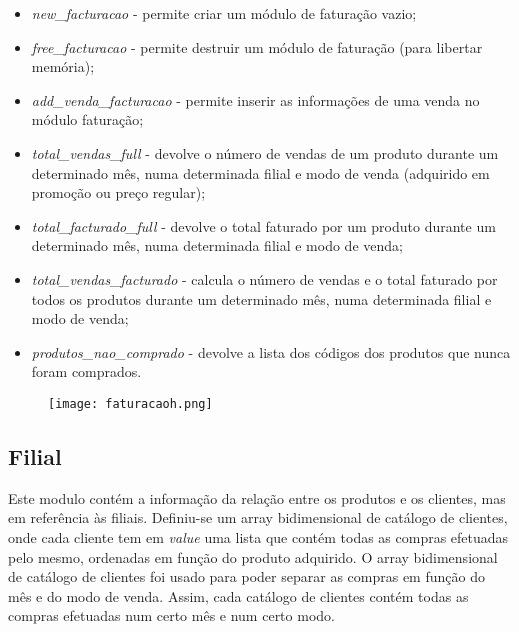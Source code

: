 \documentclass{article}
\begin{document}
\begin{itemize}
\item \textit{new\_facturacao} - permite criar um módulo de faturação vazio;
\item  \textit{free\_facturacao} - permite destruir um módulo de faturação (para libertar memória);
\item \textit{add\_venda\_facturacao} - permite inserir as informações de uma venda no módulo faturação;
\item \textit{total\_vendas\_full} - devolve o número de vendas de um produto durante um determinado mês, numa determinada filial e modo de venda (adquirido em promoção ou preço regular);
\item \textit{total\_facturado\_full} - devolve o total faturado por um produto durante um determinado mês, numa determinada filial e modo de venda;
\item \textit{total\_vendas\_facturado} - calcula o número de vendas e o total faturado por todos os produtos durante um determinado mês, numa determinada filial e modo de venda;
\item \textit{produtos\_nao\_comprado} - devolve a lista dos códigos dos produtos que nunca foram comprados.
\end{itemize}

\begin{figure}[h!]
\texttt{[image: faturacaoh.png]}
\centering
\end{figure}

\subsection{Filial}\label{sub:fil}

Este modulo contém a informação da relação entre os produtos e os clientes, mas em referência às filiais. Definiu-se um array bidimensional de catálogo de clientes, onde cada cliente tem em \textit{value} uma lista que contém todas as compras efetuadas pelo mesmo, ordenadas em função do produto adquirido. 
O array bidimensional de catálogo de clientes foi usado para poder separar as compras em função do mês e do modo de venda. Assim, cada catálogo de clientes contém todas as compras efetuadas num certo mês e num certo modo. 
\end{document}
